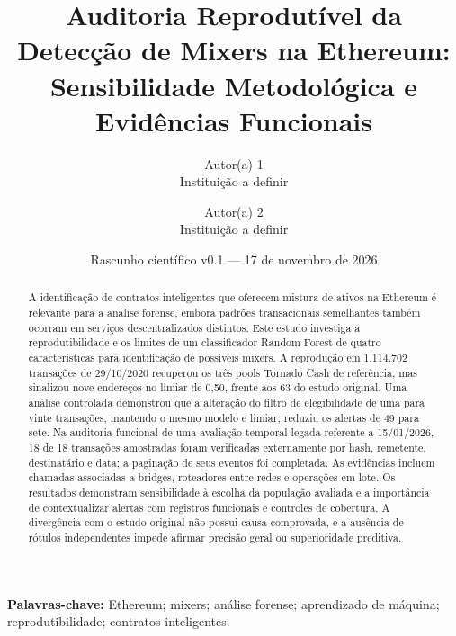 \documentclass[11pt,a4paper]{article}
\title{Auditoria Reprodutível da Detecção de Mixers na Ethereum:\\Sensibilidade Metodológica e Evidências Funcionais}
\author{Autor(a) 1\\Instituição a definir \and Autor(a) 2\\Instituição a definir}
\date{Rascunho científico v0.1 — 17 de novembro de 2026}
\begin{document}
\maketitle

\begin{abstract}
A identificação de contratos inteligentes que oferecem mistura de ativos na Ethereum é relevante para a análise forense, embora padrões transacionais semelhantes também ocorram em serviços descentralizados distintos. Este estudo investiga a reprodutibilidade e os limites de um classificador Random Forest de quatro características para identificação de possíveis mixers. A reprodução em 1.114.702 transações de 29/10/2020 recuperou os três pools Tornado Cash de referência, mas sinalizou nove endereços no limiar de 0,50, frente aos 63 do estudo original. Uma análise controlada demonstrou que a alteração do filtro de elegibilidade de uma para vinte transações, mantendo o mesmo modelo e limiar, reduziu os alertas de 49 para sete. Na auditoria funcional de uma avaliação temporal legada referente a 15/01/2026, 18 de 18 transações amostradas foram verificadas externamente por hash, remetente, destinatário e data; a paginação de seus eventos foi completada. As evidências incluem chamadas associadas a bridges, roteadores entre redes e operações em lote. Os resultados demonstram sensibilidade à escolha da população avaliada e a importância de contextualizar alertas com registros funcionais e controles de cobertura. A divergência com o estudo original não possui causa comprovada, e a ausência de rótulos independentes impede afirmar precisão geral ou superioridade preditiva.
\end{abstract}
\noindent\textbf{Palavras-chave:} Ethereum; mixers; análise forense; aprendizado de máquina; reprodutibilidade; contratos inteligentes.
\end{document}
